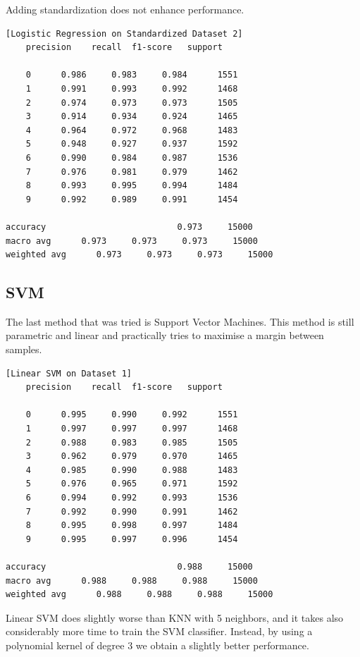 \documentclass[12pt,a4paper,oneside]{article}
\begin{document}
Adding standardization does not enhance performance.

\begin{verbatim}[Logistic Regression on Standardized Dataset 2]
    precision    recall  f1-score   support

    0      0.986     0.983     0.984      1551
    1      0.991     0.993     0.992      1468
    2      0.974     0.973     0.973      1505
    3      0.914     0.934     0.924      1465
    4      0.964     0.972     0.968      1483
    5      0.948     0.927     0.937      1592
    6      0.990     0.984     0.987      1536
    7      0.976     0.981     0.979      1462
    8      0.993     0.995     0.994      1484
    9      0.992     0.989     0.991      1454

accuracy                          0.973     15000
macro avg      0.973     0.973     0.973     15000
weighted avg      0.973     0.973     0.973     15000
\end{verbatim}

\subsection{SVM}

The last method that was tried is Support Vector Machines. This method is still
parametric and linear and practically tries to maximise a margin between
samples. 

\begin{verbatim}[Linear SVM on Dataset 1]
    precision    recall  f1-score   support

    0      0.995     0.990     0.992      1551
    1      0.997     0.997     0.997      1468
    2      0.988     0.983     0.985      1505
    3      0.962     0.979     0.970      1465
    4      0.985     0.990     0.988      1483
    5      0.976     0.965     0.971      1592
    6      0.994     0.992     0.993      1536
    7      0.992     0.990     0.991      1462
    8      0.995     0.998     0.997      1484
    9      0.995     0.997     0.996      1454

accuracy                          0.988     15000
macro avg      0.988     0.988     0.988     15000
weighted avg      0.988     0.988     0.988     15000
\end{verbatim}

Linear SVM does slightly worse than KNN with 5 neighbors, and it takes also
considerably more time to train the SVM classifier. Instead, by using a
polynomial kernel of degree 3 we obtain a slightly better performance.
\end{document}
